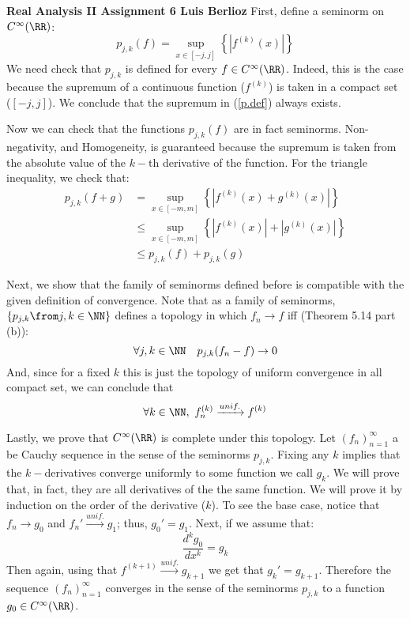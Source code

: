 \noindent\textbf{Real Analysis II Assignment 6 \hspace{\fill} Luis Berlioz}
First,  define a seminorm on $C^\infty(\RR)$:
\begin{equation}
    p_{j,k}(f)= \sup_{x\in [-j,j]} \left\{ |f^{(k)}(x) |\right\} \label{p.def}
\end{equation}
We need check that $p_{j,k}$ is defined for every $f\in C^\infty(\RR)$.
Indeed, this is the case because the supremum of a continuous function ($f^{(k)}$) is taken in a compact set ($[-j,j]$).
We conclude that the supremum in (\ref{p.def}) always exists.

Now we can check that the functions $p_{j,k}(f)$ are in fact seminorms. 
Non-negativity, and Homogeneity, is guaranteed because the supremum is taken from the absolute value of the $k-$th derivative of the function.
For the triangle inequality, we check that:
\begin{align*}
p_{j,k}(f+g) & = \sup_{x\in [-m,m]} \left\{ |f^{(k)}(x) + g^{(k)}(x)  | \right\}\\
&\leq \sup_{x\in [-m,m]} \left\{ |f^{(k)}(x) | +|g^{(k)}(x) |  \right\}\\
&\leq p_{j,k}(f) + p_{j,k}(g)
\end{align*}

Next, we show that the family of seminorms defined before is compatible with the given definition of convergence. 
Note that as a family of seminorms, $\{p_{j,k} \from j,k\in \NN\}$ defines a topology in which $f_n\to f$ iff (Theorem 5.14 part (b)):
$$\forall j,k\in\NN\quad p_{j,k}(f_n-f)\to 0$$
And, since for a fixed $k$ this is just the topology of uniform convergence in all compact set, we can conclude that 
$$\forall k\in \NN ,\ f_n^{(k)}\xrightarrow{unif.}  f^{(k)}$$

Lastly, we prove that $C^\infty(\RR)$ is complete under this topology.
Let $(f_n)_{n=1}^{\infty}$ a be Cauchy sequence in the sense of the seminorms $p_{j,k}$.
Fixing any $k$ implies that the $k-$derivatives converge uniformly to some function we call $g_k$.
We will prove that, in fact, they are all derivatives of the the same function. We will prove it  by induction on the order of the derivative ($k$).
To see the base case, notice that $f_n\to g_0$ and $f_n' \xrightarrow{unif.} g_1$; thus, $g_0'=g_1$. 
Next, if we assume that: 
$$\frac{d^k g_0}{dx^k}=g_{k}$$ 
Then again, using that  $f^{(k+1)}\xrightarrow{unif.}g_{k+1}$ we get that $g_k'=g_{k+1} $.
Therefore the sequence $(f_n)_{n=1}^{\infty}$ converges in the sense of the seminorms $p_{j,k}$ to a function $g_0 \in C^\infty(\RR)$.

